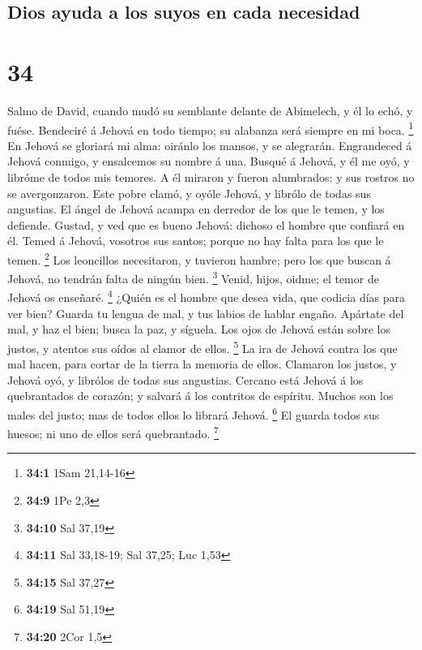 \hypertarget{dios-ayuda-a-los-suyos-en-cada-necesidad}{%
\subsection{Dios ayuda a los suyos en cada
necesidad}\label{dios-ayuda-a-los-suyos-en-cada-necesidad}}

\hypertarget{section-33}{%
\section{34}\label{section-33}}

 Salmo de David, cuando mudó su semblante delante de
Abimelech, y él lo echó, y fuése. Bendeciré á Jehová en todo tiempo; su
alabanza será siempre en mi boca. \footnote{\textbf{34:1} 1Sam 21,14-16}
 En Jehová se gloriará mi alma: oiránlo los mansos, y se
alegrarán.  Engrandeced á Jehová conmigo, y ensalcemos su
nombre á una.  Busqué á Jehová, y él me oyó, y libróme de
todos mis temores.  A él miraron y fueron alumbrados: y sus
rostros no se avergonzaron.  Este pobre clamó, y oyóle
Jehová, y librólo de todas sus angustias.  El ángel de
Jehová acampa en derredor de los que le temen, y los defiende.
 Gustad, y ved que es bueno Jehová: dichoso el hombre que
confiará en él.  Temed á Jehová, vosotros sus santos; porque
no hay falta para los que le temen. \footnote{\textbf{34:9} 1Pe 2,3}
 Los leoncillos necesitaron, y tuvieron hambre; pero los
que buscan á Jehová, no tendrán falta de ningún bien. \footnote{\textbf{34:10}
  Sal 37,19}  Venid, hijos, oidme; el temor de Jehová os
enseñaré. \footnote{\textbf{34:11} Sal 33,18-19; Sal 37,25; Luc 1,53}
 ¿Quién es el hombre que desea vida, que codicia días para
ver bien?  Guarda tu lengua de mal, y tus labios de hablar
engaño.  Apártate del mal, y haz el bien; busca la paz, y
síguela.  Los ojos de Jehová están sobre los justos, y
atentos sus oídos al clamor de ellos. \footnote{\textbf{34:15} Sal 37,27}
 La ira de Jehová contra los que mal hacen, para cortar de
la tierra la memoria de ellos.  Clamaron los justos, y
Jehová oyó, y librólos de todas sus angustias.  Cercano
está Jehová á los quebrantados de corazón; y salvará á los contritos de
espíritu.  Muchos son los males del justo; mas de todos
ellos lo librará Jehová. \footnote{\textbf{34:19} Sal 51,19}
 El guarda todos sus huesos; ni uno de ellos será
quebrantado. \footnote{\textbf{34:20} 2Cor 1,5}

